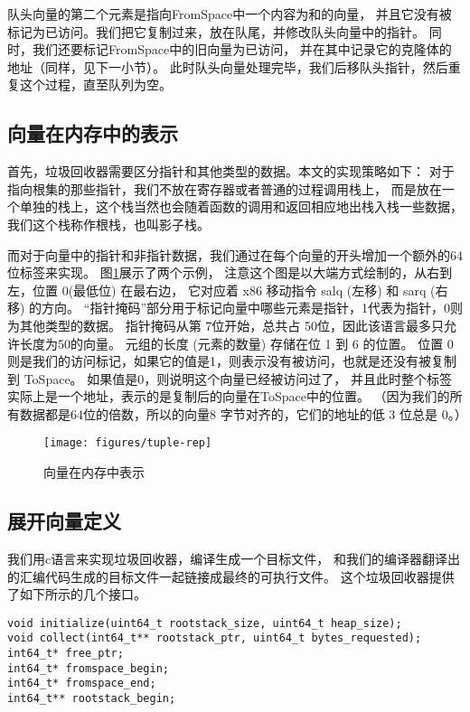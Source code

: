 队头向量的第二个元素是指向FromSpace中一个内容为和的向量，
并且它没有被标记为已访问。我们把它复制过来，放在队尾，并修改队头向量中的指针。
同时，我们还要标记FromSpace中的旧向量为已访问，
并在其中记录它的克隆体的地址（同样，见下一小节）。
此时队头向量处理完毕，我们后移队头指针，然后重复这个过程，直至队列为空。


\subsection{向量在内存中的表示}

首先，垃圾回收器需要区分指针和其他类型的数据。本文的实现策略如下：
对于指向根集的那些指针，我们不放在寄存器或者普通的过程调用栈上，
而是放在一个单独的栈上，这个栈当然也会随着函数的调用和返回相应地出栈入栈一些数据，
我们这个栈称作根栈，也叫影子栈。

而对于向量中的指针和非指针数据，我们通过在每个向量的开头增加一个额外的64位标签来实现。
图\ref{fig:tuple-rep}展示了两个示例，
注意这个图是以大端方式绘制的，从右到左，位置 0(最低位) 在最右边，
它对应着 x86 移动指令 salq (左移) 和 sarq (右移) 的方向。
“指针掩码”部分用于标记向量中哪些元素是指针，1代表为指针，0则为其他类型的数据。
指针掩码从第 7位开始，总共占 50位，因此该语言最多只允许长度为50的向量。
元组的长度 (元素的数量) 存储在位 1 到 6 的位置。
位置 0 则是我们的访问标记，如果它的值是1，则表示没有被访问，也就是还没有被复制到 ToSpace。
如果值是0，则说明这个向量已经被访问过了，
并且此时整个标签实际上是一个地址，表示的是复制后的向量在ToSpace中的位置。
（因为我们的所有数据都是64位的倍数，所以的向量8 字节对齐的，它们的地址的低 3 位总是 0。）

\begin{figure}[t]
\centering
\texttt{[image: figures/tuple-rep]}
\caption{向量在内存中表示}
\label{fig:tuple-rep}
\end{figure}


\subsection{展开向量定义}

我们用c语言来实现垃圾回收器，编译生成一个目标文件，
和我们的编译器翻译出的汇编代码生成的目标文件一起链接成最终的可执行文件。
这个垃圾回收器提供了如下所示的几个接口。
\begin{lstlisting}
void initialize(uint64_t rootstack_size, uint64_t heap_size);
void collect(int64_t** rootstack_ptr, uint64_t bytes_requested);
int64_t* free_ptr;
int64_t* fromspace_begin;
int64_t* fromspace_end;
int64_t** rootstack_begin;
\end{lstlisting}

